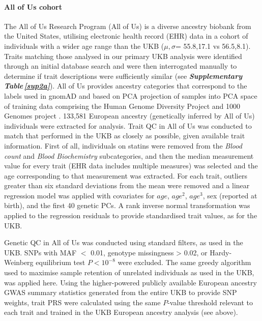 \documentclass[12pt]{zHenriquesLab-StyleBioRxiv}
\newcommand\stref[1]{\normalsize{\textbf{\textit{Supplementary Table\,\ref{#1}}}}\normalsize{}}
\begin{document}
{{\paragraph*{All of Us cohort}
The All of Us Research Program (All of Us) is a diverse ancestry biobank from the United States, utilising 
electronic health record (EHR) data in a cohort of individuals with a wider age 
range than the UKB ($\mu,\sigma$= 55.8,17.1 vs 56.5,8.1). 
Traits matching those analysed in our primary UKB analysis 
were identified through an initial database search and were 
then interrogated manually to determine if trait descriptions 
were sufficiently similar (see \stref{sup2a}).  
All of Us provides ancestry categories that correspond to the 
labels used in gnomAD \cite{gnomad} and based on PCA projection 
of samples into PCA space of training data comprising the Human Genome 
Diversity Project \cite{hgdp} and 1000 Genomes project \cite{tgp}.  
133,581  European ancestry (genetically inferred by All of Us) individuals were extracted for analysis. 
Trait QC in All of Us was conducted to match that performed in the UKB as closely as possible, given 
available trait information. First of all, individuals on statins were removed 
from the \textit{Blood count} and \textit{Blood Biochemistry} subcategories, and then the 
median measurement value for every trait (EHR data includes multiple measures) was selected and 
the age corresponding to that measurement was extracted. For each trait, outliers greater 
than six standard deviations from the mean were removed and a linear regression model was 
applied with covariates for $age$, $age^2$, $age^3$, sex (reported at birth), and the first 40 genetic PCs. 
A rank inverse normal transformation was applied to the regression residuals to provide standardised trait values, as for the UKB.

Genetic QC in All of Us was conducted using standard filters, as used
in the UKB.  SNPs with MAF $<$ 0.01, genotype missingness > 0.02, or
Hardy-Weinberg equilibrium test $P < 10^{-8}$ were excluded. The same
greedy algorithm used to maximise sample retention of unrelated
individuals as used in the UKB, was applied here. Using the
higher-powered publicly available European ancestry GWAS summary
statistics generated from the entire UKB \cite{neale} to provide SNP
weights, trait PRS were calculated \cite{prsice} using the same
$P$-value threshold relevant to each trait and trained in the UKB
European ancestry analysis (see above).




}}
\end{document}
